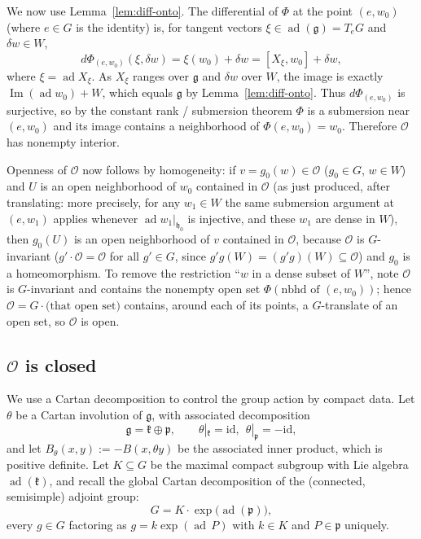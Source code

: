 \documentclass{amsart}
\theoremstyle{definition}
\begin{document}
We now use Lemma~\ref{lem:diff-onto}. The differential of $\Phi$ at the point
$(e,w_0)$ (where $e\in G$ is the identity) is, for tangent vectors
$\xi\in\operatorname{ad}(\mathfrak g)=T_eG$ and $\delta w\in W$,
\[
  d\Phi_{(e,w_0)}(\xi,\delta w)=\xi(w_0)+\delta w
  =[X_\xi,w_0]+\delta w,
\]
where $\xi=\operatorname{ad}X_\xi$. As $X_\xi$ ranges over $\mathfrak g$ and
$\delta w$ over $W$, the image is exactly
$\operatorname{Im}(\operatorname{ad}w_0)+W$, which equals $\mathfrak g$ by
Lemma~\ref{lem:diff-onto}. Thus $d\Phi_{(e,w_0)}$ is surjective, so by the constant
rank / submersion theorem $\Phi$ is a submersion near $(e,w_0)$ and its image
contains a neighborhood of $\Phi(e,w_0)=w_0$. Therefore $\mathcal O$ has nonempty
interior.

Openness of $\mathcal O$ now follows by homogeneity: if $v=g_0(w)\in\mathcal O$
($g_0\in G$, $w\in W$) and $U$ is an open neighborhood of $w_0$ contained in
$\mathcal O$ (as just produced, after translating: more precisely, for any
$w_1\in W$ the same submersion argument at $(e,w_1)$ applies whenever
$\operatorname{ad}w_1|_{\mathfrak h_0}$ is injective, and these $w_1$ are dense in
$W$), then $g_0(U)$ is an open neighborhood of $v$ contained in $\mathcal O$,
because $\mathcal O$ is $G$-invariant ($g'\!\cdot\mathcal O=\mathcal O$ for all
$g'\in G$, since $g'g(W)=(g'g)(W)\subseteq\mathcal O$) and $g_0$ is a homeomorphism.
To remove the restriction ``$w$ in a dense subset of $W$'', note $\mathcal O$ is
$G$-invariant and contains the nonempty open set $\Phi(\text{nbhd of }(e,w_0))$;
hence $\mathcal O=G\cdot\bigl(\text{that open set}\bigr)$ contains, around each of
its points, a $G$-translate of an open set, so $\mathcal O$ is open.

\subsection*{$\mathcal O$ is closed}
We use a Cartan decomposition to control the group action by compact data. Let
$\theta$ be a Cartan involution of $\mathfrak g$, with associated decomposition
\[
  \mathfrak g=\mathfrak k\oplus\mathfrak p,\qquad
  \theta|_{\mathfrak k}=\mathrm{id},\ \ \theta|_{\mathfrak p}=-\mathrm{id},
\]
and let $B_\theta(x,y):=-B(x,\theta y)$ be the associated inner product, which is
positive definite. Let $K\subseteq G$ be the maximal compact subgroup with Lie
algebra $\operatorname{ad}(\mathfrak k)$, and recall the global Cartan
decomposition of the (connected, semisimple) adjoint group:
\begin{equation}\label{eq:cartan-G}
  G=K\cdot\exp\bigl(\operatorname{ad}(\mathfrak p)\bigr),
\end{equation}
every $g\in G$ factoring as $g=k\exp(\operatorname{ad}\,P)$ with $k\in K$ and
$P\in\mathfrak p$ uniquely.
\end{document}
